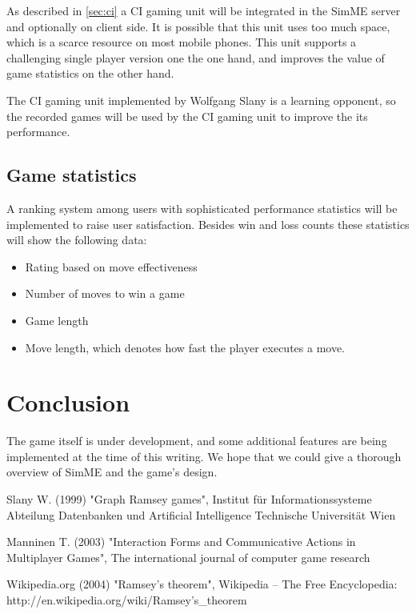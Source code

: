 		As described in \ref{sec:ci} a CI gaming unit will be integrated in the
		SimME server and optionally on client side. It is possible that this
		unit uses too much space, which is a scarce resource on most mobile
		phones. This unit supports a challenging single player version one the
		one hand, and improves the value of game statistics on the other hand.

		The CI gaming unit implemented by Wolfgang Slany is a learning opponent,
		so the recorded games will be used by the CI gaming unit to improve the
		its performance.

	\subsection{Game statistics}

		A ranking system among users with sophisticated performance statistics
		will be implemented to raise user satisfaction. Besides win and loss
		counts these statistics will show the following data:

		\begin{itemize}

			\item Rating based on move effectiveness

			\item Number of moves to win a game

			\item Game length

			\item Move length, which denotes how fast the player executes a move.

		\end{itemize}


\section{Conclusion}

	The game itself is under development, and some additional features are being
	implemented at the time of this writing. We hope that we could give a
	thorough overview of SimME and the game's design.



\begin{thebibliography}{10}

	 Slany W. (1999) "Graph Ramsey games",
	Institut f\"ur Informationssysteme Abteilung Datenbanken und Artificial
	Intelligence Technische Universit\"at Wien

	 Manninen T. (2003) "Interaction Forms and
	Communicative Actions in Multiplayer Games", The international journal of
	computer game research

	 Wikipedia.org (2004) "Ramsey's theorem", Wikipedia --
	The Free Encyclopedia: http://en.wikipedia.org/wiki/Ramsey's\_theorem

\end{thebibliography}


